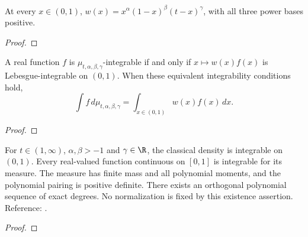 \begin{supporting}
\begin{theorem}
\label{thm:semiclassical-jacobi-weight-characterisation}
\leanok
At every $x\in(0,1)$, $w(x)=x^\alpha(1-x)^\beta(t-x)^\gamma$, with all three power bases positive.
\end{theorem}
\begin{proof}
\leanok
\end{proof}



\begin{theorem}
\label{thm:semiclassical-jacobi-measure-characterisation}
\leanok
A real function $f$ is $\mu_{t,\alpha,\beta,\gamma}$-integrable if and only if $x\mapsto w(x)f(x)$ is Lebesgue-integrable on $(0,1)$. When these equivalent integrability conditions hold,
\[\int f\,d\mu_{t,\alpha,\beta,\gamma}=\int_{x\in(0,1)}w(x)f(x)\,dx.\]
\end{theorem}
\begin{proof}
\leanok
\end{proof}

\begin{theorem}
\label{thm:semiclassical-jacobi-measure}

\leanok
For $t\in(1,\infty)$, $\alpha,\beta>-1$ and $\gamma\in\R$, the classical density is integrable on $(0,1)$. Every real-valued function continuous on $[0,1]$ is integrable for its measure. The measure has finite mass and all polynomial moments, and the polynomial pairing is positive definite. There exists an orthogonal polynomial sequence of exact degrees. No normalization is fixed by this existence assertion.
Reference: \cite[Section 3]{pgso}.
\end{theorem}
\begin{proof}
\leanok
\end{proof}
\end{supporting}


